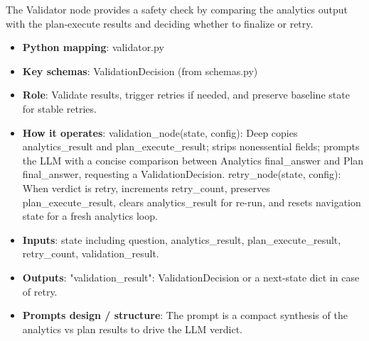The Validator node provides a safety check by comparing the analytics output with the plan-execute results and deciding whether to finalize or retry.

\begin{itemize}
  \item \textbf{Python mapping}: validator.py
  \item \textbf{Key schemas}: ValidationDecision (from schemas.py)
  \item \textbf{Role}: Validate results, trigger retries if needed, and preserve baseline state for stable retries.
  \item \textbf{How it operates}:
    \subitem validation\_node(state, config): Deep copies analytics\_result and plan\_execute\_result; strips nonessential fields; prompts the LLM with a concise comparison between Analytics final\_answer and Plan final\_answer, requesting a ValidationDecision.
    \subitem retry\_node(state, config): When verdict is retry, increments retry\_count, preserves plan\_execute\_result, clears analytics\_result for re-run, and resets navigation state for a fresh analytics loop.
  \item \textbf{Inputs}: state including question, analytics\_result, plan\_execute\_result, retry\_count, validation\_result.
  \item \textbf{Outputs}: {"validation\_result": ValidationDecision} or a next-state dict in case of retry.
  \item \textbf{Prompts design / structure}:
    \subitem The prompt is a compact synthesis of the analytics vs plan results to drive the LLM verdict.
\end{itemize}
